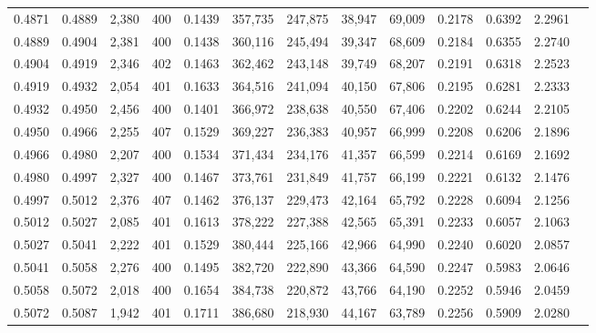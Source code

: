 \begin{tabular}{rrrrrrrrrrrrr}
0.4871 & 0.4889 &  2,380 & 400 &                                     0.1439 & 357,735 & 247,875 &  38,947 &  69,009 & 0.2178 & 0.6392 & 2.2961 \\
0.4889 & 0.4904 &  2,381 & 400 &                                     0.1438 & 360,116 & 245,494 &  39,347 &  68,609 & 0.2184 & 0.6355 & 2.2740 \\
0.4904 & 0.4919 &  2,346 & 402 &                                     0.1463 & 362,462 & 243,148 &  39,749 &  68,207 & 0.2191 & 0.6318 & 2.2523 \\
0.4919 & 0.4932 &  2,054 & 401 &                                     0.1633 & 364,516 & 241,094 &  40,150 &  67,806 & 0.2195 & 0.6281 & 2.2333 \\
0.4932 & 0.4950 &  2,456 & 400 &                                     0.1401 & 366,972 & 238,638 &  40,550 &  67,406 & 0.2202 & 0.6244 & 2.2105 \\
0.4950 & 0.4966 &  2,255 & 407 &                                     0.1529 & 369,227 & 236,383 &  40,957 &  66,999 & 0.2208 & 0.6206 & 2.1896 \\
0.4966 & 0.4980 &  2,207 & 400 &                                     0.1534 & 371,434 & 234,176 &  41,357 &  66,599 & 0.2214 & 0.6169 & 2.1692 \\
0.4980 & 0.4997 &  2,327 & 400 &                                     0.1467 & 373,761 & 231,849 &  41,757 &  66,199 & 0.2221 & 0.6132 & 2.1476 \\
0.4997 & 0.5012 &  2,376 & 407 &                                     0.1462 & 376,137 & 229,473 &  42,164 &  65,792 & 0.2228 & 0.6094 & 2.1256 \\
0.5012 & 0.5027 &  2,085 & 401 &                                     0.1613 & 378,222 & 227,388 &  42,565 &  65,391 & 0.2233 & 0.6057 & 2.1063 \\
0.5027 & 0.5041 &  2,222 & 401 &                                     0.1529 & 380,444 & 225,166 &  42,966 &  64,990 & 0.2240 & 0.6020 & 2.0857 \\
0.5041 & 0.5058 &  2,276 & 400 &                                     0.1495 & 382,720 & 222,890 &  43,366 &  64,590 & 0.2247 & 0.5983 & 2.0646 \\
0.5058 & 0.5072 &  2,018 & 400 &                                     0.1654 & 384,738 & 220,872 &  43,766 &  64,190 & 0.2252 & 0.5946 & 2.0459 \\
0.5072 & 0.5087 &  1,942 & 401 &                                     0.1711 & 386,680 & 218,930 &  44,167 &  63,789 & 0.2256 & 0.5909 & 2.0280 \\

\end{tabular}
